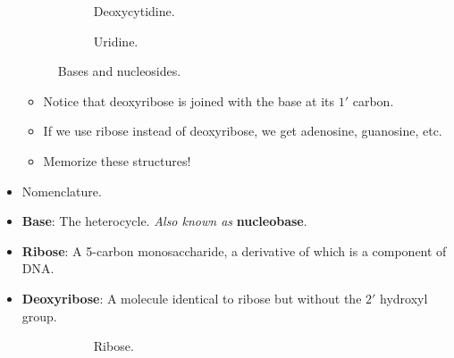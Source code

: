 \documentclass[../notes.tex]{subfiles}
\begin{document}
\begin{itemize}
\begin{figure}[h!]
\begin{subfigure}[b]{0.32\linewidth}
            \caption{Deoxycytidine.}
            \label{fig:baseNucleosidei}
        \end{subfigure}
        \begin{subfigure}[b]{0.33\linewidth}
            \centering
            \vspace{1em}
            \caption{Uridine.}
            \label{fig:baseNucleosidej}
        \end{subfigure}
        \caption{Bases and nucleosides.}
        \label{fig:baseNucleoside}
    \end{figure}
    \begin{itemize}
        \item Notice that deoxyribose is joined with the base at its $1'$ carbon.
        \item If we use ribose instead of deoxyribose, we get adenosine, guanosine, etc.
        \item Memorize these structures!
    \end{itemize}
    \item Nomenclature.
    \item \textbf{Base}: The heterocycle. \emph{Also known as} \textbf{nucleobase}.
    \item \textbf{Ribose}: A 5-carbon monosaccharide, a derivative of which is a component of DNA.
    \item \textbf{Deoxyribose}: A molecule identical to ribose but without the $2'$ hydroxyl group.
    \begin{figure}[H]
        \centering
        \footnotesize
        \begin{subfigure}[b]{0.2\linewidth}
            \centering
            \caption{Ribose.}
            \label{fig:dnaSugarsa}
        \end{subfigure}
        \begin{subfigure}[b]{0.2\linewidth}

\end{subfigure}
\end{figure}
\end{itemize}
\end{document}
